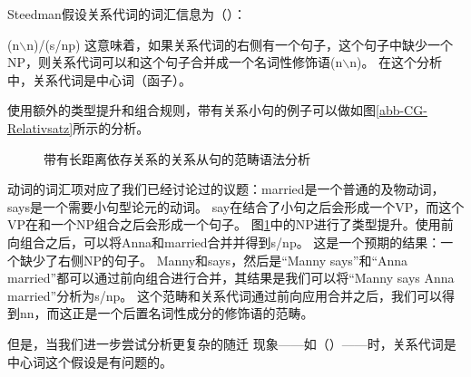 Steedman假设关系代词的词汇信息为（）：

\ea
\label{le-Relativpronomen-CG}
(n$\backslash$n)/(s/np)
\z
这意味着，如果关系代词的右侧有一个句子，这个句子中缺少一个NP，则关系代词可以和这个句子合并成一个名词性修饰语(n$\backslash$n)。
在这个分析中，关系代词是中心词（函子）。

使用额外的类型提升和组合规则，带有关系小句的例子可以做如图\vref{abb-CG-Relativsatz}所示的分析。
%
\begin{figure}
\centerline{%
}
\caption{\label{abb-CG-Relativsatz}带有长距离依存关系的关系从句的范畴语法分析}
\end{figure}%
%
动词的词汇项对应了我们已经讨论过的议题：married是一个普通的及物动词，says是一个需要小句型论元的动词。
say在结合了小句之后会形成一个VP，而这个VP在和一个NP组合之后会形成一个句子。
图\ref{abb-CG-Relativsatz}中的NP进行了类型提升。使用前向组合之后，可以将Anna和married合并并得到s/np。
这是一个预期的结果：一个缺少了右侧NP的句子。
Manny和says，然后是“Manny says”和“Anna married”都可以通过前向组合进行合并，其结果是我们可以将“Manny says Anna married”分析为s/np。
这个范畴和关系代词通过前向应用合并之后，我们可以得到n\bs n，而这正是一个后置名词性成分的修饰语的范畴。

但是，当我们进一步尝试分析更复杂的随迁
现象——如（）——时，关系代词是中心词这个假设是有问题的。

